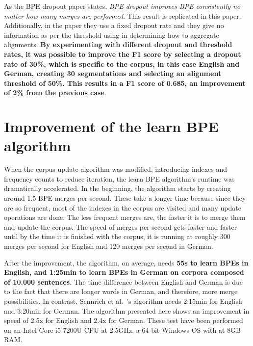 As the BPE dropout paper states, \emph{BPE dropout improves BPE consistently no matter how many merges are performed}. This result is replicated in this paper. Additionally, in the paper they use a fixed dropout rate and they give no information as per the threshold using in determining how to aggregate alignments. \textbf{By experimenting with different dropout and threshold rates, it was possible to improve the F1 score by selecting a dropout rate of 30\%, which is specific to the corpus, in this case English and German, creating 30 segmentations and selecting an alignment threshold of 50\%. This results in a F1 score of 0.685, an improvement of 2\% from the previous case}.

\section{Improvement of the learn BPE algorithm}

When the corpus update algorithm was modified, introducing indexes and frequency counts to reduce iteration, the learn BPE algorithm's runtime was dramatically accelerated. In the beginning, the algorithm starts by creating around 1.5 BPE merges per second. These take a longer time because since they are so frequent, most of the indexes in the corpus are visited and many update operations are done. The less frequent merges are, the faster it is to merge them and update the corpus. The speed of merges per second gets faster and faster until by the time it is finished with the corpus, it is running at roughly 300 merges per second for English and 120 merges per second in German.

After the improvement, the algorithm, on average, needs \textbf{55s to learn BPEs in English, and 1:25min to learn BPEs in German on corpora composed of 10.000 sentences}. The time difference between English and German is due to the fact that there are longer words in German, and therefore, more merge possibilities. In contrast, Sennrich et al.~\cite{sennrich2015neural}'s algorithm needs 2:15min for English and 3:20min for German. The algorithm presented here shows an improvement in speed of 2.5x for English and 2.4x for German. These test have been performed on an Intel Core i5-7200U CPU at 2.5GHz, a 64-bit Windows OS with at 8GB RAM.

